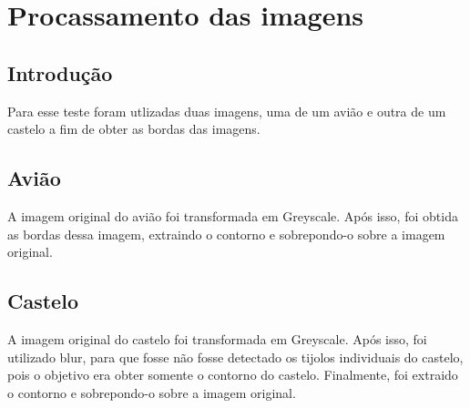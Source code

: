 \chapter{Procassamento das imagens} \label{processamento}

\section{Introdução}

Para esse teste foram utlizadas duas imagens, uma de um avião e outra de um castelo
a fim de obter as bordas das imagens.

\section{Avião}

A imagem original do avião foi transformada em Greyscale. Após isso, foi obtida
as bordas dessa imagem, extraindo o contorno e sobrepondo-o sobre a imagem original.


\section{Castelo}

A imagem original do castelo foi transformada em Greyscale. Após isso, foi 
utilizado blur, para que fosse não fosse detectado os tijolos individuais do castelo,
 pois o objetivo era obter somente o contorno do castelo. Finalmente, foi extraido
 o contorno e sobrepondo-o sobre a imagem original.

